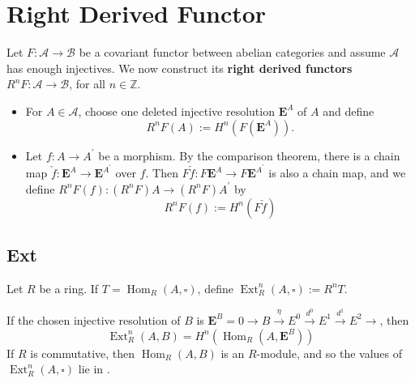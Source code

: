 \documentclass[12pt, oneside]{book}
\begin{document}
\section{Right Derived Functor}
\begin{definition}
    Let $F: \mathcal{A} \rightarrow \mathcal{B}$ be a covariant functor between abelian categories and assume $\mathcal{A}$ has enough injectives.
    We now construct its \textbf{right derived functors} $R^n F: \mathcal{A} \rightarrow \mathcal{B}$, for all $n \in \mathbb{Z}$.
    \begin{itemize}
        \item
              For $A\in \mathcal{A}$, choose one deleted injective resolution $\mathbf{E}^A$ of $A$ and define
              \begin{equation*}
                  R^n F \left(A\right)
                  :=
                  H^n\left(F \left(\mathbf{E}^A\right)\right) .
              \end{equation*}
        \item
              Let $f: A \rightarrow A^{\prime}$ be a morphism. By the comparison theorem, there is a chain map $\check{f}: \mathbf{E}^A \rightarrow \mathbf{E}^{A^{\prime}}$ over $f$. Then $F \check{f}: F \mathbf{E}^A \rightarrow F \mathbf{E}^{A^{\prime}}$ is also a chain map, and we define $R^n F\left(f\right):\left(R^n F\right) A \rightarrow\left(R^n F\right) A^{\prime}$ by
              \begin{equation*}
                  R^n F \left(f\right)
                  :=
                  H^n(F \check{f})
              \end{equation*}
    \end{itemize}
\end{definition}


\subsection{Ext}
\begin{definition}
    Let $R$ be a ring. If $T=\operatorname{Hom}_R(A, \square)$, define $\operatorname{Ext}_R^n(A, \square):=R^n T$.
    \begin{remark}
        If the chosen injective resolution of $B$ is $\mathbf{E}^B=0 \rightarrow B \xrightarrow{\eta} E^0 \xrightarrow{d^0} E^1 \xrightarrow{d^1} E^2 \rightarrow$, then
        \begin{equation*}
            \operatorname{Ext}_R^n(A, B)
            =
            H^n\left(\operatorname{Hom}_R\left(A, \mathbf{E}^B\right)\right)
        \end{equation*}
        If $R$ is commutative, then $\operatorname{Hom}_R(A, B)$ is an $R$-module, and so the values of $\operatorname{Ext}_R^n(A, \square)$ lie in .
    \end{remark}
\end{definition}
\end{document}

